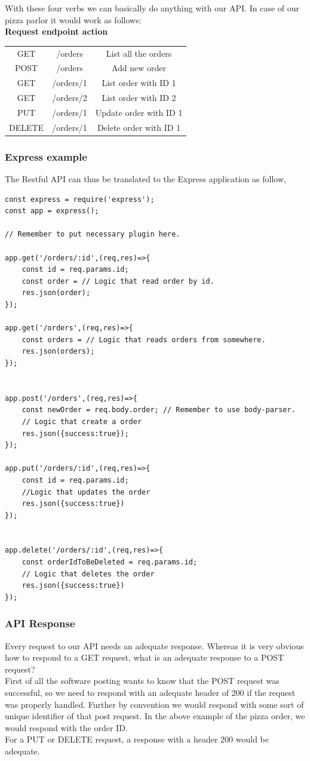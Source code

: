 \documentclass[a4paper]{article}
\begin{document}
With these four verbs we can basically do anything with our API. In case of our pizza parlor it would work as follows:\\
\textbf{Request endpoint action}\\
\begin{tabular}{ccc}
GET & /orders & List all the orders\\
POST &/orders  & Add new order\\
GET & /orders/1& List order with ID 1\\
GET & /orders/2& List order with ID 2\\
PUT & /orders/1& Update order with ID 1\\
DELETE & /orders/1& Delete order with ID 1\\
\end{tabular}
\subsubsection{Express example}
The Restful API can thus be translated to the Express application as follow,
\begin{lstlisting}
const express = require('express');
const app = express();

// Remember to put necessary plugin here.

app.get('/orders/:id',(req,res)=>{
    const id = req.params.id;
    const order = // Logic that read order by id.
    res.json(order);
});

app.get('/orders',(req,res)=>{
    const orders = // Logic that reads orders from somewhere.
    res.json(orders);
});


app.post('/orders',(req,res)=>{
    const newOrder = req.body.order; // Remember to use body-parser.
    // Logic that create a order
    res.json({success:true});
});

app.put('/orders/:id',(req,res)=>{
    const id = req.params.id;
    //Logic that updates the order
    res.json({success:true})
});


app.delete('/orders/:id',(req,res)=>{
    const orderIdToBeDeleted = req.params.id;
    // Logic that deletes the order
    res.json({success:true})
});
\end{lstlisting}

\subsubsection{API Response}
Every request to our API needs an adequate response. Whereas it is very obvious how to respond to a GET request, what is an adequate response to a POST request?
\\
First of all the software posting wants to know that the POST request was successful, so we need to respond with an adequate header of 200 if the request was properly handled. Further by convention we would respond with some sort of unique identifier of that post request. In the above example of the pizza order, we would respond with the order ID.
\\
For a PUT or DELETE request, a response with a header 200 would be adequate.
\end{document}
